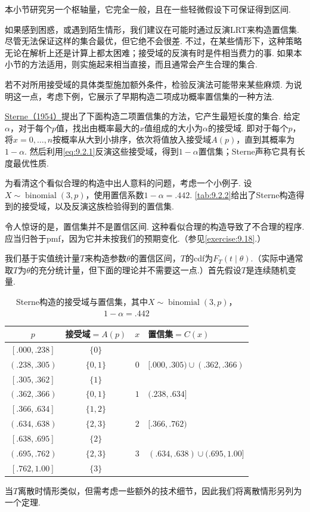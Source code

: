 本小节研究另一个枢轴量，它完全一般，且在一些轻微假设下可保证得到区间.

如果感到困惑，或遇到陌生情形，我们建议在可能时通过反演LRT来构造置信集. 尽管无法保证这样的集合最优，但它绝不会很差. 不过，在某些情形下，这种策略无论在解析上还是计算上都太困难；接受域的反演有时是件相当费力的事. 如果本小节的方法适用，则实施起来相当直接，而且通常会产生合理的集合.

若不对所用接受域的具体类型施加额外条件，检验反演法可能带来某些麻烦. 为说明这一点，考虑下例，它展示了早期构造二项成功概率置信集的一种方法.
\begin{example}[最短长度二项置信集]\label{ex:9.2.11}
\hyperref[bib:source305]{Sterne（1954）}提出了下面构造二项置信集的方法，它产生最短长度的集合. 给定$\alpha$，对于每个$p$值，找出由概率最大的$x$值组成的大小为$\alpha$的接受域. 即对于每个$p$，将$x=0,\ldots,n$按概率从大到小排序，依次将值放入接受域$A(p)$，直到其概率为$1-\alpha$. 然后利用\eqref{eq:9.2.1}反演这些接受域，得到$1-\alpha$置信集；Sterne声称它具有长度最优性质.

为看清这个看似合理的构造中出人意料的问题，考虑一个小例子. 设$X\sim\operatorname{binomial}(3,p)$，使用置信系数$1-\alpha=.442$. \autoref{tab:9.2.2}给出了Sterne构造得到的接受域，以及反演这族检验得到的置信集.

令人惊讶的是，置信集并不是置信区间. 这种看似合理的构造导致了不合理的程序. 应当归咎于pmf，因为它并未按我们的预期变化.（参见\autoref{exercise:9.18}.）
\end{example}
我们基于实值统计量$T$来构造参数$\theta$的置信区间，$T$的cdf为$F_T(t\mid\theta)$.（实际中通常取$T$为$\theta$的充分统计量，但下面的理论并不需要这一点.）首先假设$T$是连续随机变量.
\par
\begin{table}[htbp]\centering
\caption{Sterne构造的接受域与置信集，其中$X\sim\operatorname{binomial}(3,p)$，$1-\alpha=.442$}\label{tab:9.2.2}
\begin{tabular}{cc|cl}\toprule
$p$&接受域$=A(p)$&$x$&置信集$=C(x)$\\\midrule
$[.000,.238]$&$\{0\}$&&\\
$(.238,.305)$&$\{0,1\}$&$0$&$[.000,.305)\cup(.362,.366)$\\
$[.305,.362]$&$\{1\}$&&\\
$(.362,.366)$&$\{0,1\}$&$1$&$(.238,.634]$\\
$[.366,.634]$&$\{1,2\}$&&\\
$(.634,.638)$&$\{2,3\}$&$2$&$[.366,.762)$\\
$[.638,.695]$&$\{2\}$&&\\
$(.695,.762)$&$\{2,3\}$&$3$&$(.634,.638)\cup(.695,1.00]$\\
$[.762,1.00]$&$\{3\}$&&\\\bottomrule
\end{tabular}
\end{table}
\par
当$T$离散时情形类似，但需考虑一些额外的技术细节，因此我们将离散情形另列为一个定理.

